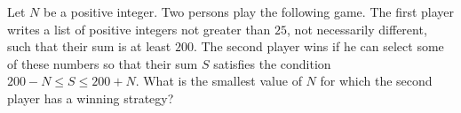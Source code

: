 Let $N$ be a positive integer. Two persons play the following game. The first player writes a list of positive integers not greater than $25$,  not necessarily different, such that their sum is at least $200$. The second player wins if he can select some of these numbers so that their sum $S$ satisfies the condition $200-N\le S\le 200+N$. What is the smallest value of $N$ for which the second player has a winning strategy?